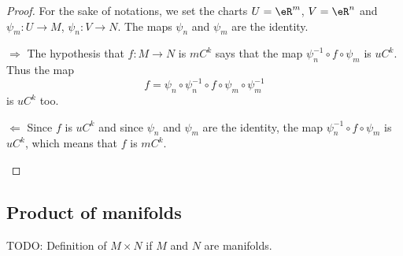 \begin{proof}
    For the sake of notations, we set the charts \( U=\eR^m\), \( V=\eR^n\) and \( \psi_m\colon U\to M\), \( \psi_n\colon V\to N\). The maps \( \psi_n\) and \( \psi_m\) are the identity.
    \begin{subproof}
    \item[\( \Rightarrow\)]
        The hypothesis that \( f\colon M\to N\) is \( mC^k\) says that the map \( \psi_n^{-1}\circ f\circ\psi_m\) is \( uC^k\). Thus the map
        \begin{equation}
            f=\psi_n\circ\psi_n^{-1}\circ f\circ\psi_m\circ\psi_m^{-1}
        \end{equation}
        is \( uC^k\) too.
    \item[\( \Leftarrow\)]
        Since \( f\) is \( uC^k\) and since \( \psi_n\) and \( \psi_m\) are the identity, the map \( \psi_n^{-1}\circ f\circ\psi_m\) is \( uC^k\), which means that \( f\) is \( mC^k\).
    \end{subproof}
\end{proof}

\subsection{Product of manifolds}

\begin{definition}      \label{DEFooYOLXooDPrnHa}
    TODO: Definition of \( M\times N\) if \( M\) and \( N\) are manifolds.
\end{definition}


